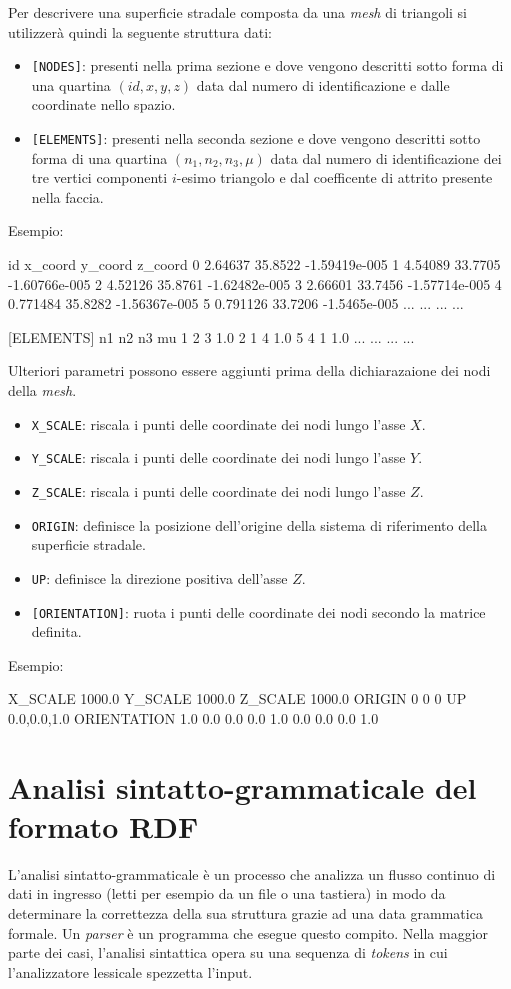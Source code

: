 Per descrivere una superficie stradale composta da una \textit{mesh} di triangoli si utilizzerà quindi la seguente struttura dati:
\begin{itemize}
	\item \texttt{[NODES]}: presenti nella prima sezione e dove vengono descritti sotto forma di una quartina $(id,x,y,z)$ data dal numero di identificazione e dalle coordinate nello spazio.
	\item \texttt{[ELEMENTS]}: presenti nella seconda sezione e dove vengono descritti sotto forma di una quartina $(n_1,n_2,n_3,\mu)$ data dal numero di identificazione dei tre vertici componenti $i$-esimo triangolo e dal coefficente di attrito presente nella faccia.
\end{itemize}
Esempio:
\begin{pseudoc}
	[NODES]
	{ id x_coord y_coord z_coord }
	0 2.64637 35.8522 -1.59419e-005 
	1 4.54089 33.7705 -1.60766e-005 
	2 4.52126 35.8761 -1.62482e-005 
	3 2.66601 33.7456 -1.57714e-005 
	4 0.771484 35.8282 -1.56367e-005 
	5 0.791126 33.7206 -1.5465e-005
	... ... ... ...
	
	[ELEMENTS]
	{ n1 n2 n3 mu }
	1 2 3 1.0 
	2 1 4 1.0 
	5 4 1 1.0 
	... ... ... ...
\end{pseudoc}

Ulteriori parametri possono essere aggiunti prima della dichiarazaione dei nodi della \textit{mesh}.
\begin{itemize}
	\item \texttt{X\_SCALE}: riscala i punti delle coordinate dei nodi lungo l'asse $X$.
	\item \texttt{Y\_SCALE}: riscala i punti delle coordinate dei nodi lungo l'asse $Y$.
	\item \texttt{Z\_SCALE}: riscala i punti delle coordinate dei nodi lungo l'asse $Z$.
	\item \texttt{ORIGIN}: definisce la posizione dell'origine della sistema di riferimento della superficie stradale.
	\item \texttt{UP}: definisce la direzione positiva dell'asse $Z$.
	\item \texttt{[ORIENTATION]}: ruota i punti delle coordinate dei nodi secondo la matrice definita.
\end{itemize}
Esempio:
\begin{pseudoc}
	X_SCALE
	1000.0
	Y_SCALE
	1000.0
	Z_SCALE
	1000.0
	ORIGIN
	0 0 0
	UP
	0.0,0.0,1.0
	ORIENTATION
	1.0  0.0  0.0
	0.0  1.0  0.0
	0.0  0.0  1.0
\end{pseudoc}
%
\section{Analisi sintatto-grammaticale del formato RDF}
%
L'analisi sintatto-grammaticale è un processo che analizza un flusso continuo di dati in ingresso (letti per esempio da un file o una tastiera) in modo da determinare la correttezza della sua struttura grazie ad una data grammatica formale. Un \textit{parser} è un programma che esegue questo compito. Nella maggior parte dei casi, l'analisi sintattica opera su una sequenza di \textit{tokens} in cui l'analizzatore lessicale spezzetta l'input.

